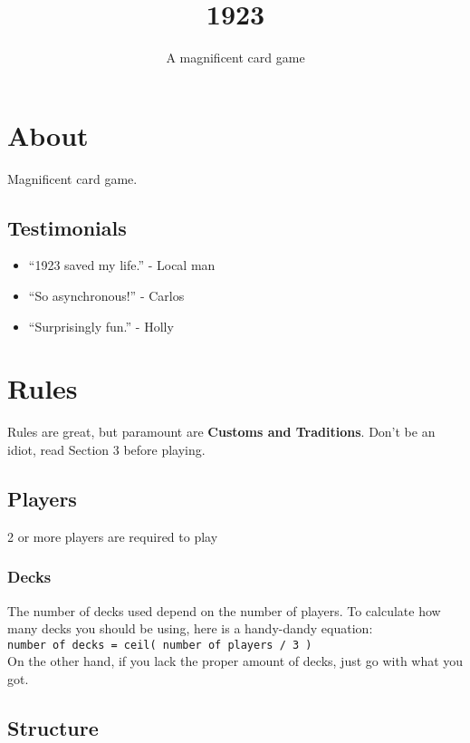 \documentclass[11pt]{article}
\title{1923}
\author{A magnificent card game}
\date{}
\begin{document}
\maketitle

\setcounter{tocdepth}{3}
\tableofcontents
\vspace*{1cm}


\section{About}
\label{sec-1}

Magnificent card game.
\subsection{Testimonials}
\label{sec-1-1}

\begin{itemize}
\item ``1923 saved my life.'' - Local man
\item ``So asynchronous!'' - Carlos
\item ``Surprisingly fun.'' - Holly
\end{itemize}
  
\section{Rules}
\label{sec-2}


Rules are great, but paramount are \textbf{Customs and Traditions}. Don't be
an idiot, read Section 3 before playing.
\subsection{Players}
\label{sec-2-1}

2 or more players are required to play
\subsubsection{Decks}
\label{sec-2-1-1}

The number of decks used depend on the number of players. To
calculate how many decks you should be using, here is a handy-dandy
equation:\\

\texttt{number of decks = ceil( number of players / 3 )}\\

On the other hand, if you lack the proper amount of decks, just go
with what you got. 
\subsection{Structure}
\label{sec-2-2}
\end{document}

